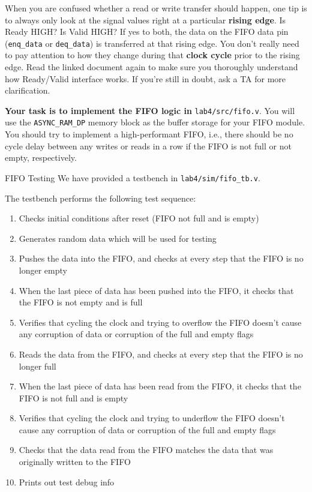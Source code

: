 \documentclass[11pt]{article}
\makeatletter
\renewcommand{\subsection}
{\@startsection {subsection}{1}{0pt}
 {-1ex}
 {0.5ex}
 {\bfseries\normalsize}}
\makeatother
\begin{document}
When you are confused whether a read or write transfer should happen, one tip is to always only look at the signal values right at a particular \textbf{rising edge}. Is Ready HIGH? Is Valid HIGH? If yes to both, the data on the FIFO data pin (\verb|enq_data| or \verb|deq_data|) is transferred at that rising edge. You don't really need to pay attention to how they change during that \textbf{clock cycle} prior to the rising edge. Read the linked document again to make sure you thoroughly understand how Ready/Valid interface works. If you're still in doubt, ask a TA for more clarification.

\textbf{Your task is to implement the FIFO logic in} \verb|lab4/src/fifo.v|. You will use the \verb|ASYNC_RAM_DP| memory block as the buffer storage for your FIFO module.
You should try to implement a high-performant FIFO, i.e., there should be no cycle delay between any writes or reads in a row if the FIFO is not full or not empty, respectively.

\subsection{FIFO Testing}
We have provided a testbench in \verb|lab4/sim/fifo_tb.v|.

The testbench performs the following test sequence:
\begin{enumerate}
    \item Checks initial conditions after reset (FIFO not full and is empty)
    \item Generates random data which will be used for testing
    \item Pushes the data into the FIFO, and checks at every step that the FIFO is no longer empty
    \item When the last piece of data has been pushed into the FIFO, it checks that the FIFO is not empty and is full
    \item Verifies that cycling the clock and trying to overflow the FIFO doesn't cause any corruption of data or corruption of the full and empty flags
    \item Reads the data from the FIFO, and checks at every step that the FIFO is no longer full
    \item When the last piece of data has been read from the FIFO, it checks that the FIFO is not full and is empty
    \item Verifies that cycling the clock and trying to underflow the FIFO doesn't cause any corruption of data or corruption of the full and empty flags
    \item Checks that the data read from the FIFO matches the data that was originally written to the FIFO
    \item Prints out test debug info
\end{enumerate}
\end{document}
